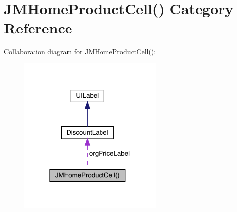 \hypertarget{category_j_m_home_product_cell_07_08}{}\section{J\+M\+Home\+Product\+Cell() Category Reference}
\label{category_j_m_home_product_cell_07_08}


Collaboration diagram for J\+M\+Home\+Product\+Cell()\+:\nopagebreak
\begin{figure}[H]
\begin{center}
\leavevmode
\includegraphics[width=202pt]{category_j_m_home_product_cell_07_08__coll__graph}
\end{center}
\end{figure}
